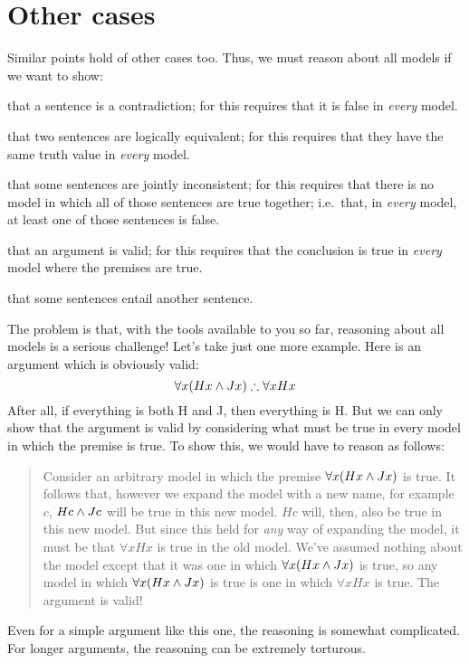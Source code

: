 \section{Other cases}
Similar points hold of other cases too. Thus, we must reason about all models if we want to show:
	\begin{ebullet}
		\item that a sentence is a contradiction; for this requires that it is false in \emph{every} model.
		\item that two sentences are logically equivalent; for this requires that they have the same truth value in \emph{every} model.
		\item that some sentences are jointly inconsistent; for this requires that there is no model in which all of those sentences are true together; i.e.\ that, in \emph{every} model, at  least one of those sentences is false.
		\item that an argument is valid; for this requires that the conclusion is true in \emph{every} model where the premises are true.
		\item that some sentences entail another sentence.
	\end{ebullet}
The problem is that, with the tools available to you so far, reasoning about all models is a serious challenge! Let's take just one more example. Here is an argument which is obviously valid:
	$$\forall x(Hx \eand Jx) \therefore \forall x Hx$$
After all, if everything is both H and J, then everything is H. But we can only show that the argument is valid by considering what must be true in every model in which the premise is true. To show this, we would have to reason as follows:
	\begin{quote}
		Consider an arbitrary model in which the premise $\forall x(Hx \mathbin{\wedge} Jx)$ is true. It follows that, however we expand the model with a new name, for example $c$, $Hc \mathbin{\wedge} Jc$ will be true in this new model. $Hc$ will, then, also be true in this new model. But since this held for \emph{any} way of expanding the model, it must be that $\forall x Hx$ is true in the old model. We've assumed nothing about the model except that it was one in which $\forall x(Hx \mathbin{\wedge} Jx)$  is true, so any model in which $\forall x(Hx \mathbin{\wedge} Jx)$ is true is one in which $\forall x Hx$ is true. The argument is valid!
\end{quote}
Even for a simple argument like this one, the reasoning is somewhat complicated. For longer arguments, the reasoning can be extremely torturous.

